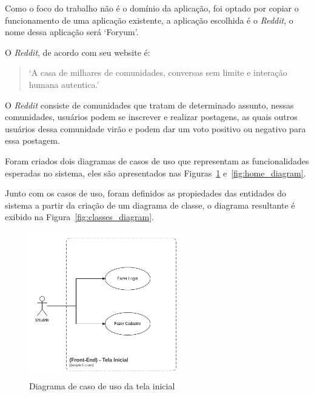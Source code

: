 \documentclass[12pt]{article}
\begin{document}
Como o foco do trabalho não é o domínio da aplicação, foi optado por copiar o funcionamento de uma aplicação
existente, a aplicação escolhida é o \textit{Reddit}, o nome dessa aplicação será `Foryum'.

O \textit{Reddit}, de acordo com seu website é:

\begin{quote}
  `A casa de milhares de comunidades, conversas sem
  limite e interação humana autentica.'
\end{quote}

O \textit{Reddit} consiste de comunidades que tratam de determinado assunto, nessas comunidades, usuários
podem se inscrever e realizar postagens, as quais outros usuários dessa comunidade virão e podem
dar um voto positivo ou negativo para essa postagem.

Foram criados dois diagramas de casos de uso que representam as funcionalidades esperadas no sistema,
eles são apresentados nas Figuras~\ref{fig:welcome_diagram} e~\ref{fig:home_diagram}.

Junto com os casos de uso, foram definidos as propiedades das entidades do sistema
a partir da criação de um diagrama de classe, o diagrama resultante é exibido
na Figura~\ref{fig:classes_diagram}.


\begin{figure}[H]
    \centering
    \includegraphics[width=0.6\textwidth]{diagrams/welcome_diagram.png}
    \caption{Diagrama de caso de uso da tela inicial}\label{fig:welcome_diagram}
\end{figure}
\end{document}
